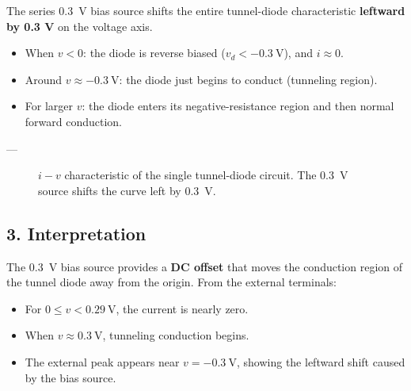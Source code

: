 \documentclass{article}
\begin{document}
The series \SI{0.3}{V} bias source shifts the entire tunnel-diode characteristic 
\textbf{leftward by 0.3 V} on the voltage axis.

\begin{itemize}
  \item When \(v < 0\): the diode is reverse biased (\(v_d < -0.3~\text{V}\)), and \(i \approx 0\).
  \item Around \(v \approx -0.3~\text{V}\): the diode just begins to conduct (tunneling region).
  \item For larger \(v\): the diode enters its negative-resistance region and then normal forward conduction.
\end{itemize}

---

\begin{figure}[htbp]
\centering
{}
\caption{\(i\!-\!v\) characteristic of the single tunnel-diode circuit.
The \SI{0.3}{V} source shifts the curve left by \SI{0.3}{V}.}
\end{figure}

\subsection*{3. Interpretation}

The \SI{0.3}{V} bias source provides a \textbf{DC offset} that moves the conduction
region of the tunnel diode away from the origin.  
From the external terminals:
\begin{itemize}
  \item For \(0 \le v < 0.29~\text{V}\), the current is nearly zero.
  \item When \(v \approx 0.3~\text{V}\), tunneling conduction begins.
  \item The external peak appears near \(v = -0.3~\text{V}\), showing the leftward shift caused by the bias source.
\end{itemize}
\end{document}
